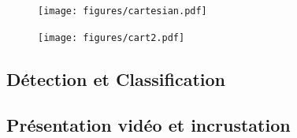 			\begin{figure}[htb]
				\centering
				\begin{minipage}{.5\textwidth}
					\centering
					\texttt{[image: figures/cartesian.pdf]}
					\label{fig:platlong}
				\end{minipage}%
				\begin{minipage}{.5\textwidth}
					\centering
					\texttt{[image: figures/cart2.pdf]}
					\label{fig:pequirect}
				\end{minipage}
			\end{figure}
			\par
			
		\subsection{Détection et Classification}
		
			
		\subsection{Présentation vidéo et incrustation}
		
